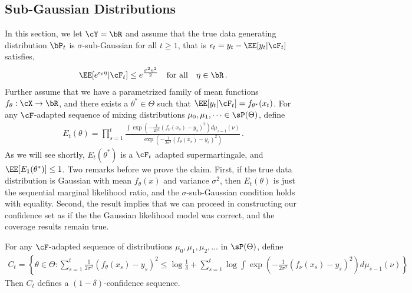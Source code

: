 \subsection{Sub-Gaussian Distributions}\label{sec:subgaussian}
In this section, we let $\cY = \bR$ and assume that the true data generating distribution $\bP_t$ is $\sigma$-sub-Gaussian for all $t \geq 1$, that is $\epsilon_t = y_t - \EE[y_t|\cF_{t}]$ satisfies,
\begin{align*}
\EE[e^{\epsilon_t \eta}|\cF_t] \leq e^{\frac{\sigma^2 \eta^2}{2}} \quad \text{for all} \quad \eta \in \bR \,.
\end{align*}
Further assume that we have a parametrized family of mean functions $f_\theta : \cX \rightarrow \bR$, and there exists a $\theta^* \in \Theta$ such that $\EE[y_t|\cF_t] = f_{\theta^*}(x_t)$.
For any $\cF$-adapted sequence of mixing distributions $\mu_0, \mu_1, \dots \in \sP(\Theta)$, define
    \begin{align*}
        E_t(\theta) = \prod_{s=1}^t \frac{ \int \exp(- \frac{1}{2 \sigma^2} (f_{\nu}(x_s) - y_s)^2) d\mu_{s-1}(\nu)}{\exp(- \frac{1}{2 \sigma^2} (f_\theta(x_s) - y_s)^2)} \,.
    \end{align*}
As we will see shortly, $E_t(\theta^*)$ is a $\cF_t$ adapted supermartingale, and $\EE[E_1(\theta^*)] \leq 1$.
Two remarks before we prove the claim. First, if the true data distribution is Gaussian with mean $f_\theta(x)$ and variance $\sigma^2$, then $E_t(\theta)$ is just the sequential marginal likelihood ratio, and the $\sigma$-sub-Gaussian condition holds with equality. Second, the result implies that we can proceed in constructing our confidence set as if the the Gaussian likelihood model was correct, and the coverage results remain true.
\begin{theorem}
    For any $\cF$-adapted sequence of distributions $\mu_0, \mu_1, \mu_2, \dots$ in $\sP(\Theta)$, define
    \begin{align*}
        C_t = \left\{ \theta \in \Theta:   \sum_{s=1}^t \tfrac{1}{2 \sigma^2}(f_\theta(x_s) - y_s)^2 \leq \log \frac{1}{\delta} + \sum_{s=1}^t \log \int  \exp( -\tfrac{1}{2 \sigma^2} (f_{\nu}(x_s) - y_s)^2) d\mu_{s-1}(\nu)\right\}
    \end{align*}
    Then $C_t$ defines a $(1-\delta)$-confidence sequence.
\end{theorem}
